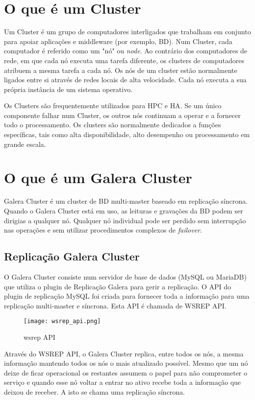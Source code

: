 \section{O que é um Cluster}
Um Cluster é um grupo de computadores interligados que trabalham em conjunto para apoiar aplicações e middleware (por exemplo, \ac{BD}). Num Cluster, cada computador é referido como um "nó" ou \textit{node}. Ao contrário dos computadores de rede, em que cada nó executa uma tarefa diferente, os clusters de computadores atribuem a mesma tarefa a cada nó. Os nós de um cluster estão normalmente ligados entre si através de redes locais de alta velocidade. Cada nó executa a sua própria instância de um sistema operativo.

Os Clusters são frequentemente utilizados para \ac{HPC} e \ac{HA}. Se um único componente falhar num Cluster, os outros nós continuam a operar e a fornecer todo o processamento.
Os clusters são normalmente dedicados a funções específicas, tais como alta disponibilidade, alto desempenho ou processamento em grande escala.

\section{O que é um Galera Cluster}
Galera Cluster é um cluster de \ac{BD} multi-master baseado em replicação síncrona. Quando o Galera Cluster está em uso, as leituras e gravações da \ac{BD} podem ser dirigias a qualquer nó. Qualquer nó individual pode ser perdido sem interrupção nas operações e sem utilizar procedimentos complexos de \textit{failover}.

\subsection{Replicação Galera Cluster}
O Galera Cluster consiste num servidor de base de dados (MySQL ou MariaDB) que utiliza o plugin de Replicação Galera para gerir a replicação. O \ac{API} do plugin de replicação MySQL foi criada para fornecer toda a informação para uma replicação multi-master e síncrona. Esta \ac{API} é chamada de \ac{WSREP} API. 

\begin{figure}[H]
\center
\texttt{[image: wsrep\_api.png]}
\caption{wsrep API}
\end{figure}

Através do \ac{WSREP} API, o Galera Cluster replica, entre todos os nós, a mesma informação mantendo todos os nós o mais atualizado possível. Mesmo que um nó deixe de ficar operacional os restantes assumem o papel para não comprometer o serviço e quando esse nó voltar a entrar no ativo recebe toda a informação que deixou de receber. A isto se chama uma replicação síncrona.


